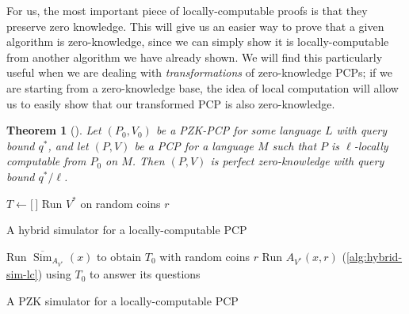 \documentclass[english,12pt]{reedthesis}
\theoremstyle{plain}
\newtheorem{thm}{Theorem}[section]
\theoremstyle{definition}
\theoremstyle{remark}
\DeclareMathOperator{\Sim}{Sim}
\begin{document}
For us, the most important piece of locally-computable proofs is that they
preserve zero knowledge. This will give us an easier way to prove that a given
algorithm is zero-knowledge, since we can simply show it is locally-computable
from another algorithm we have already shown. We will find this particularly
useful when we are dealing with \emph{transformations} of zero-knowledge PCPs;
if we are starting from a zero-knowledge base, the idea of local computation
will allow us to easily show that our transformed PCP is also zero-knowledge.

\begin{thm}[{\cite[Lemma 3.2]{GOS25}}]\label{thm:local-comp-pzk}
  Let $(P_{0}, V_{0})$ be a PZK-PCP for some language $L$ with query bound
  $q^{*}$, and let $(P, V)$ be a PCP for a language $M$ such that $P$ is
  $\ell$-locally computable from $P_{0}$ on $M$. Then $(P, V)$ is perfect
  zero-knowledge with query bound $q^{*}/\ell$.
\end{thm}

\begin{algorithm}[htbp]
  $T \leftarrow \lbrack\,\rbrack$\;
  Run $V^{*}$ on random coins $r$\;
  \;
  \caption{A hybrid simulator for a locally-computable PCP~\cite[Construction
    3.3]{GOS25}}\label{alg:hybrid-sim-lc}
\end{algorithm}

\begin{algorithm}[htbp]
  Run $\overline{\Sim}_{A_{V^{*}}}(x)$ to obtain $T_{0}$ with random coins $r$\;
  Run $A_{V^{*}}(x, r)$ (\cref{alg:hybrid-sim-lc}) using $T_{0}$ to answer its
  questions\;
  \;
  \caption{A PZK simulator for a locally-computable PCP~\cite[Construction
    3.4]{GOS25}}\label{alg:pzk-sim-lc}
\end{algorithm}
\end{document}
